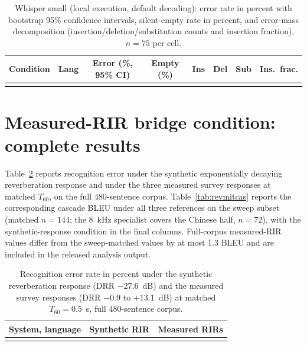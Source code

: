\documentclass[11pt]{article}
\begin{document}
\begin{table}[h]
\centering
\caption{Whisper small (local execution, default decoding): error rate in
percent with bootstrap 95\% confidence intervals, silent-empty rate in
percent, and error-mass decomposition (insertion/deletion/substitution
counts and insertion fraction), $n = 75$ per cell.}
\label{tab:whisper}
\small
\setlength{\tabcolsep}{3.4pt}
\begin{tabular}{llcccccc}
\toprule
Condition & Lang & Error (\%, 95\% CI) & Empty (\%) & Ins & Del & Sub & Ins.\ frac. \\
\midrule
 \\
\bottomrule
\end{tabular}
\end{table}

\section{Measured-RIR bridge condition: complete results}
\label{supp:revmit}

Table~\ref{tab:revmitasr} reports recognition error under the synthetic
exponentially decaying reverberation response and under the three measured
survey responses at matched $T_{60}$, on the full 480-sentence corpus.
Table~\ref{tab:revmitcas} reports the corresponding cascade BLEU under all
three references on the sweep subset (matched $n{=}144$; the 8~kHz
specialist covers the Chinese half, $n{=}72$), with the synthetic-response
condition in the final columns. Full-corpus measured-RIR values differ
from the sweep-matched values by at most 1.3 BLEU and are included in the
released analysis output.

\begin{table}[h]
\centering
\caption{Recognition error rate in percent under the synthetic
reverberation response (DRR $-27.6$~dB) and the measured survey responses
(DRR $-0.9$ to $+13.1$~dB) at matched $T_{60} = 0.5$~s, full 480-sentence
corpus.}
\label{tab:revmitasr}
\small
\begin{tabular}{lll}
\toprule
System, language & Synthetic RIR & Measured RIRs \\
\midrule
 \\
\bottomrule
\end{tabular}
\end{table}
\end{document}
